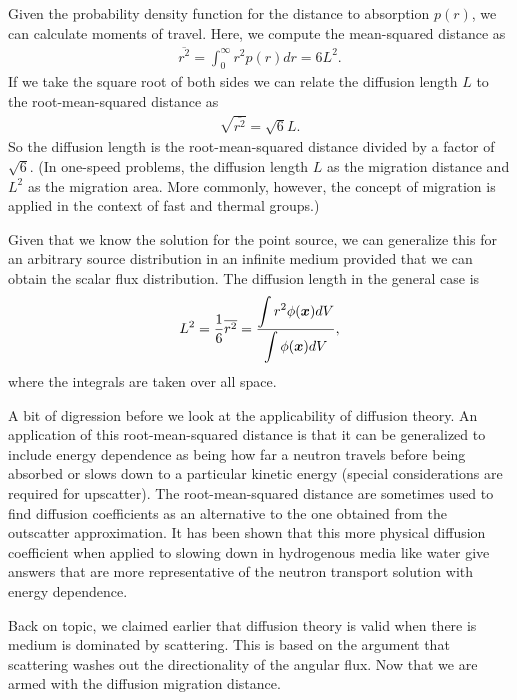 Given the probability density function for the distance to absorption $p(r)$, we can calculate moments of travel. Here, we compute the mean-squared distance as
\begin{align}
  \overline{r^2} = \int_0^\infty r^2 p(r) dr = 6 L^2.
\end{align}
If we take the square root of both sides we can relate the diffusion length $L$ to the root-mean-squared distance as
\begin{align}
  \sqrt{ \overline{r^2} } = \sqrt{6} L .
\end{align}
So the diffusion length is the root-mean-squared distance divided by a factor of $\sqrt{6}$. (In one-speed problems, the diffusion length $L$ as the migration distance and $L^2$ as the migration area. More commonly, however, the concept of migration is applied in the context of fast and thermal groups.)

Given that we know the solution for the point source, we can generalize this for an arbitrary source distribution in an infinite medium provided that we can obtain the scalar flux distribution. The diffusion length in the general case is
\begin{align}
  L^2 = \frac{1}{6} \overline{r^2}= \dfrac{ \displaystyle\int r^2 \phi(\bm{x}) dV }{ \displaystyle\int \phi(\bm{x}) dV } ,
\end{align}
where the integrals are taken over all space.

A bit of digression before we look at the applicability of diffusion theory. An application of this root-mean-squared distance is that it can be generalized to include energy dependence as being how far a neutron travels before being absorbed or slows down to a particular kinetic energy (special considerations are required for upscatter). The root-mean-squared distance are sometimes used to find diffusion coefficients as an alternative to the one obtained from the outscatter approximation. It has been shown that this more physical diffusion coefficient when applied to slowing down in hydrogenous media like water give answers that are more representative of the neutron transport solution with energy dependence.

Back on topic, we claimed earlier that diffusion theory is valid when there is medium is dominated by scattering. This is based on the argument that scattering washes out the directionality of the angular flux. Now that we are armed with the diffusion migration distance. 

